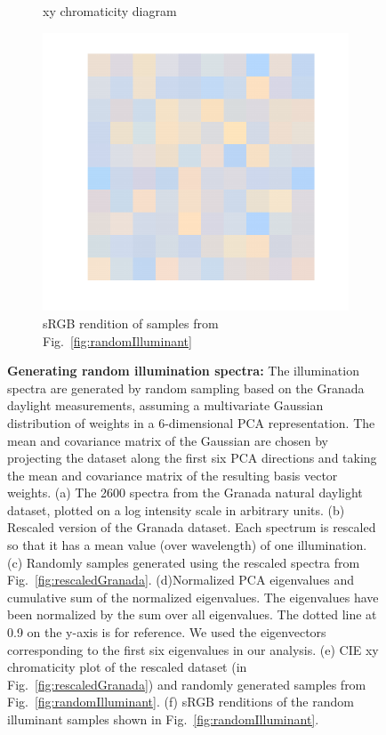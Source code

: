 \documentclass{jov}
\begin{document}
\begin{figure}
\begin{subfigure}[b]{0.3 \textwidth}
        \caption{xy chromaticity diagram}
        \label{fig:xyDiagram}
    \end{subfigure}
      	\begin{subfigure}[b]{0.3 \textwidth}
    \centering
        \includegraphics[width=\textwidth]{../Figures/Figure6/Figure6_f.pdf}
        \caption{sRGB rendition of samples from Fig.~\ref{fig:randomIlluminant}}
        \label{fig:sRGBIlluminant}
    \end{subfigure}
    \caption{{\bf Generating random illumination spectra:} The illumination spectra are generated by random sampling based on the Granada daylight measurements, assuming a multivariate Gaussian distribution of weights in a 6-dimensional PCA representation. The mean and covariance matrix of the Gaussian are chosen by projecting the dataset along the first six PCA directions and taking the mean and covariance matrix of the resulting basis vector weights. (a) The 2600 spectra from the Granada natural daylight dataset, plotted on a log intensity scale in arbitrary units. (b) Rescaled version of the Granada dataset. Each spectrum is rescaled so that it has a mean value (over wavelength) of one illumination. (c) Randomly samples generated using the rescaled spectra from Fig.~\ref{fig:rescaledGranada}. (d)Normalized PCA eigenvalues and cumulative sum of the normalized eigenvalues. The eigenvalues have been normalized by the sum over all eigenvalues. The dotted line at 0.9 on the y-axis is for reference. We used the eigenvectors corresponding to the first six eigenvalues in our analysis. (e) CIE xy chromaticity plot of the rescaled dataset (in Fig.~\ref{fig:rescaledGranada}) and randomly generated samples from Fig.~\ref{fig:randomIlluminant}. (f) sRGB renditions of the random illuminant samples shown in Fig.~\ref{fig:randomIlluminant}.}\label{fig:illluminationGeneration}
\end{figure}
\end{document}

